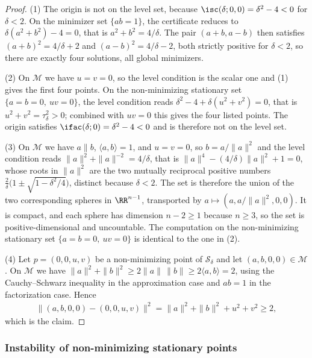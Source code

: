 \documentclass{article}
\begin{document}
\begin{proof}
(1) The origin is not on the level set, because
$\isc(\delta;0,0)=\delta^2-4<0$ for $\delta<2$. On the minimizer set
$\{ab=1\}$, the certificate reduces to $\delta(a^2+b^2)-4=0$, that is
$a^2+b^2=4/\delta$. The
pair $(a+b,a-b)$ then satisfies $(a+b)^2=4/\delta+2$ and
$(a-b)^2=4/\delta-2$, both strictly positive for $\delta<2$, so there are
exactly four solutions, all global minimizers.

(2) On $\mathcal M$ we have
$u=v=0$, so the level condition is the scalar one and (1) gives the first four
points. On the non-minimizing stationary set $\{a=b=0,\ uv=0\}$, the level
condition reads
$\delta^2-4+\delta(u^2+v^2)=0$, that is $u^2+v^2=\tau_\delta^2>0$; combined
with $uv=0$ this gives the four listed points. The origin satisfies
$\ifac(\delta;0)=\delta^2-4<0$ and is therefore not on the level set.

(3) On $\mathcal M$ we have $a\parallel b$, $\langle a,b\rangle=1$, and
$u=v=0$, so $b=a/\|a\|^2$ and the level condition reads
$\|a\|^2+\|a\|^{-2}=4/\delta$, that is $\|a\|^4-(4/\delta)\|a\|^2+1=0$, whose
roots in $\|a\|^2$ are the two mutually reciprocal positive numbers
$\tfrac2\delta\bigl(1\pm\sqrt{1-\delta^2/4}\bigr)$, distinct because
$\delta<2$. The set is therefore the union of the two corresponding spheres in
$\RR^{n-1}$, transported by
$a\mapsto(a,a/\|a\|^2,0,0)$. It is compact, and each sphere has dimension
$n-2\ge1$ because $n\ge3$, so the set is positive-dimensional and
uncountable. The computation on the non-minimizing stationary set
$\{a=b=0,\ uv=0\}$ is identical to the one in (2).

(4) Let $p=(0,0,u,v)$ be a non-minimizing point of $\mathcal S_\delta$ and let
$(a,b,0,0)\in\mathcal M$. On $\mathcal M$ we have
$\|a\|^2+\|b\|^2\ge2\|a\|\,\|b\|\ge2\langle a,b\rangle=2$, using the
Cauchy--Schwarz inequality in the approximation case and $ab=1$ in the
factorization case. Hence
\begin{align}
    \bigl\|(a,b,0,0)-(0,0,u,v)\bigr\|^2
    =
    \|a\|^2+\|b\|^2+u^2+v^2
    \ge 2,
\end{align}
which is the claim.
\end{proof}

\subsubsection{Instability of non-minimizing stationary points}
\label{subsec:exclude_nonmin_stationary_rank1}
\end{document}
